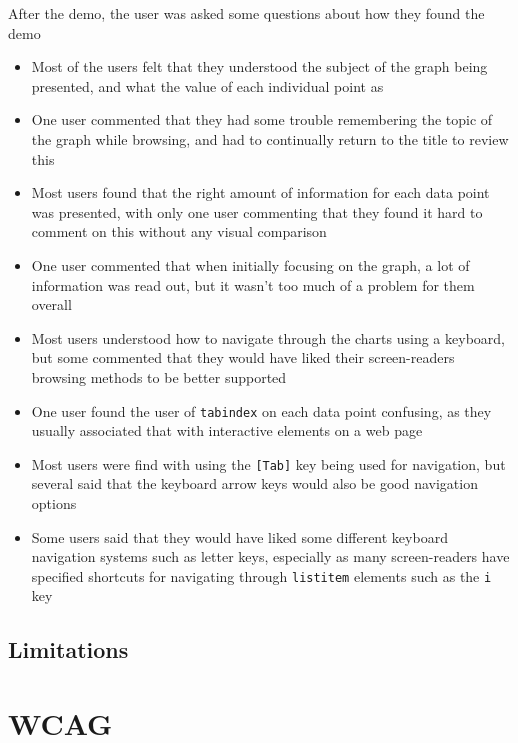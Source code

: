 \documentclass[ %
                    author={Aleena Baig},
                supervisor={Dr Simon Lock},
                    degree={BSc},
                     title={On Making Web Accessible Graphs},
                  subtitle={},
                      year={2019} ]{dissertation}
\begin{document}
After the demo, the user was asked some questions about how they found the demo

\begin{itemize}
    \item Most of the users felt that they understood the subject of the graph being presented, and what the value of each individual point as
    \item One user commented that they had some trouble remembering the topic of the graph while browsing, and had to continually return to the title to review this
    \item Most users found that the right amount of information for each data point was presented, with only one user commenting that they found it hard to comment on this without any visual comparison
    \item One user commented that when initially focusing on the graph, a lot of information was read out, but it wasn't too much of a problem for them overall
    \item Most users understood how to navigate through the charts using a keyboard, but some commented that they would have liked their screen-readers browsing methods to be better supported
    \item One user found the user of \texttt{tabindex} on each data point confusing, as they usually associated that with interactive elements on a web page
    \item Most users were find with using the \texttt{[Tab]} key being used for navigation, but several said that the keyboard arrow keys would also be good navigation options
    \item Some users said that they would have liked some different keyboard navigation systems such as letter keys, especially as many screen-readers have specified shortcuts for navigating through \texttt{listitem} elements such as the \texttt{i} key
\end{itemize}

\subsection{Limitations}


\section{WCAG}
\end{document}
